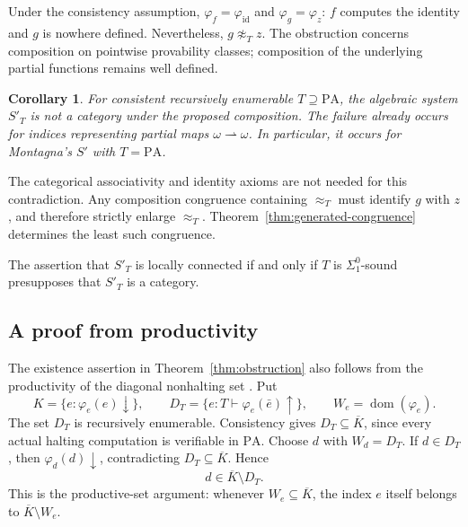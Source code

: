 \documentclass[11pt]{article}
\newtheorem{corollary}[theorem]{Corollary}
\newcommand{\PA}{\mathrm{PA}}
\begin{document}
Under the consistency assumption, $\varphi_f=\varphi_{\mathrm{id}}$
and $\varphi_g=\varphi_z$: $f$ computes the identity and $g$ is nowhere
defined. Nevertheless, $g\not\approx_Tz$. The obstruction concerns
composition on pointwise provability classes; composition of the underlying
partial functions remains well defined.

\begin{corollary}\label{cor:not-category}
For consistent recursively enumerable $T\supseteq\PA$, the algebraic
system $S'_T$ is not a category under the proposed composition.
The failure already occurs for indices representing partial maps
$\omega\rightharpoonup\omega$. In particular, it occurs for
Montagna's $S'$ with $T=\PA$.
\end{corollary}

The categorical associativity and identity axioms are not needed for
this contradiction.
Any composition congruence containing $\approx_T$ must identify $g$
with $z$, and therefore strictly enlarge $\approx_T$.
Theorem~\ref{thm:generated-congruence} determines the least such congruence.

The assertion that $S'_T$ is locally connected if and only if $T$
is $\Sigma^0_1$-sound \cite[Theorem~4.5, pp.~658--659]{DiPaolaMontagna}
presupposes that $S'_T$ is a category.

\subsection{A proof from productivity}\label{sec:productive}

The existence assertion in Theorem~\ref{thm:obstruction} also follows from
the productivity of the diagonal nonhalting set
\cite[Section~5.3, p.~136]{GallierQuaintance}.
Put
\[
 K=\{e:\varphi_e(e)\downarrow\},\qquad
 D_T=\{e:T\vdash\varphi_e(\bar e)\uparrow\},
 \qquad W_e=\operatorname{dom}(\varphi_e).
\]
The set $D_T$ is recursively enumerable. Consistency gives
$D_T\subseteq\overline K$, since every actual halting computation is
verifiable in $\PA$. Choose $d$ with $W_d=D_T$.
If $d\in D_T$, then $\varphi_d(d)\downarrow$, contradicting
$D_T\subseteq\overline K$. Hence
\[
 d\in\overline K\setminus D_T.
\]
This is the productive-set argument: whenever $W_e\subseteq\overline K$,
the index $e$ itself belongs to $\overline K\setminus W_e$.
\end{document}
